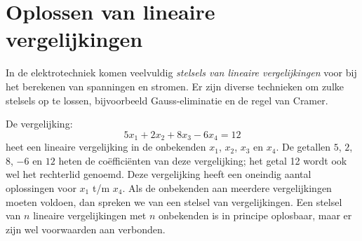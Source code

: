 

\chapter{Oplossen van lineaire vergelijkingen}
\label{cha:linsolve}
In de elektrotechniek komen veelvuldig \textsl{stelsels van lineaire vergelijkingen} voor bij het berekenen van spanningen en stromen. Er zijn diverse technieken om zulke stelsels op te lossen, bijvoorbeeld Gauss-eliminatie en de regel van Cramer.

De vergelijking:
\begin{equation}
5x_1 + 2x_2 + 8x_3 - 6x_4 = 12
\end{equation}
heet een lineaire vergelijking in de onbekenden $x_1$, $x_2$, $x_3$ en $x_4$. De getallen $5$, $2$, $8$, $-6$ en $12$ heten de coëfficiënten van deze vergelijking; het getal 12 wordt ook wel het rechterlid genoemd. Deze vergelijking heeft een oneindig aantal oplossingen voor $x_1$ t/m $x_4$. Als de onbekenden aan meerdere vergelijkingen moeten voldoen, dan spreken we van een stelsel van vergelijkingen. Een stelsel van $n$ lineaire vergelijkingen met $n$ onbekenden is in principe oplosbaar, maar er zijn wel voorwaarden aan verbonden.

